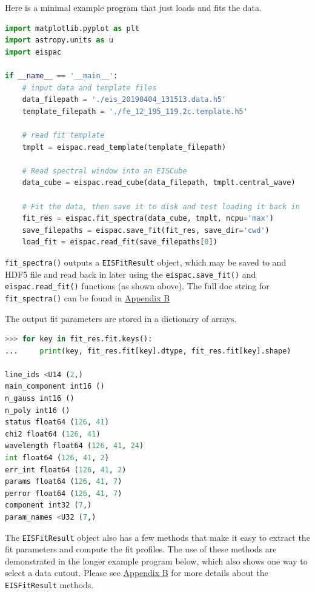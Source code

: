 Here is a minimal example program that just loads and fits the data.
\begin{lstlisting}[language=Python]
import matplotlib.pyplot as plt
import astropy.units as u
import eispac

if __name__ == '__main__':
    # input data and template files
    data_filepath = './eis_20190404_131513.data.h5'
    template_filepath = './fe_12_195_119.2c.template.h5'

    # read fit template
    tmplt = eispac.read_template(template_filepath)

    # Read spectral window into an EISCube
    data_cube = eispac.read_cube(data_filepath, tmplt.central_wave)

    # Fit the data, then save it to disk and test loading it back in
    fit_res = eispac.fit_spectra(data_cube, tmplt, ncpu='max')
    save_filepaths = eispac.save_fit(fit_res, save_dir='cwd')
    load_fit = eispac.read_fit(save_filepaths[0])
\end{lstlisting}

\verb+fit_spectra()+ outputs a \verb+EISFitResult+ object, which may be saved to and HDF5 file and read back in later using the \verb+eispac.save_fit()+ and \verb+eispac.read_fit()+ functions (as shown above). The full doc string for \verb+fit_spectra()+ can be found in \hyperref[sec:fitspec]{Appendix B}

The output fit parameters are stored in a dictionary of arrays.

\begin{lstlisting}[language=Python]
>>> for key in fit_res.fit.keys():
...     print(key, fit_res.fit[key].dtype, fit_res.fit[key].shape)

line_ids <U14 (2,)
main_component int16 ()
n_gauss int16 ()
n_poly int16 ()
status float64 (126, 41)
chi2 float64 (126, 41)
wavelength float64 (126, 41, 24)
int float64 (126, 41, 2)
err_int float64 (126, 41, 2)
params float64 (126, 41, 7)
perror float64 (126, 41, 7)
component int32 (7,)
param_names <U32 (7,)
\end{lstlisting}

The \verb+EISFitResult+ object also has a few methods that make it easy to extract the fit parameters and compute the fit profiles. The use of these methods are demonstrated in the longer example program below, which also shows one way to select a data cutout. Please see \hyperref[sec:EISFitResult]{Appendix B} for more details about the \verb+EISFitResult+ methods.

